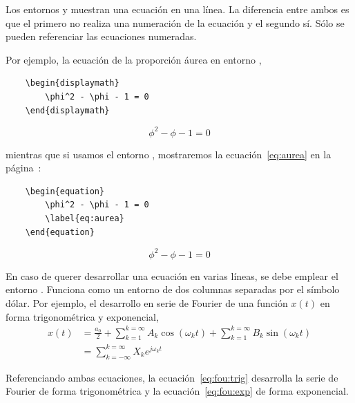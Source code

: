 Los entornos  y  muestran una ecuación en una línea. La diferencia entre ambos es que el primero no realiza una numeración de la ecuación y el segundo sí. Sólo se pueden referenciar las ecuaciones numeradas.

Por ejemplo, la ecuación de la proporción áurea en entorno ,

\begin{lstlisting}
	\begin{displaymath}
		\phi^2 - \phi - 1 = 0
	\end{displaymath}
\end{lstlisting}

\begin{displaymath}
	\phi^2 - \phi - 1 = 0
\end{displaymath}

\noindent mientras que si usamos el entorno , mostraremos la ecuación~\ref{eq:aurea} en la página~\pageref{eq:aurea}:
\begin{lstlisting}
	\begin{equation}
		\phi^2 - \phi - 1 = 0
		\label{eq:aurea}
	\end{equation}
\end{lstlisting}

\begin{equation}
	\phi^2 - \phi - 1 = 0
	\label{eq:aurea}
\end{equation}


En caso de querer desarrollar una ecuación en varias líneas, se debe emplear el entorno . Funciona como un entorno  de dos columnas separadas por el símbolo dólar. Por ejemplo, el desarrollo en serie de Fourier de una función $x(t)$ en forma trigonométrica y exponencial,
\begin{align}
	x(t) & = \frac{a_0}{2} %
	     + \sum_{k = 1}^{k = \infty}{A_k \cos(\omega_{k} t)}
			 + \sum_{k = 1}^{k = \infty}{B_k \sin(\omega_{k} t)}\label{eq:fou:trig} \\
			 & = \sum_{k = -\infty}^{k = \infty}{X_k e^{j \omega_k t}}\label{eq:fou:exp}
\end{align}

Referenciando ambas ecuaciones, la ecuación~\ref{eq:fou:trig} desarrolla la serie de Fourier de forma trigonométrica y la ecuación~\ref{eq:fou:exp} de forma exponencial.

